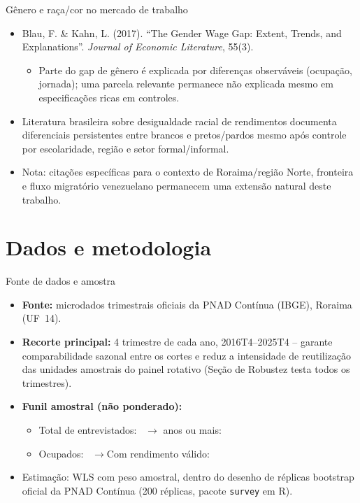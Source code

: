 \documentclass[aspectratio=169]{beamer}
\newcommand{\highlight}[1]{\textcolor{accentblue}{\textbf{#1}}}
\begin{document}
\begin{frame}{G\^enero e ra\c{c}a/cor no mercado de trabalho}
  \begin{itemize}
    \item Blau, F. \& Kahn, L. (2017). ``The Gender Wage Gap: Extent, Trends, and Explanations''. \textit{Journal of Economic Literature}, 55(3).
    \begin{itemize}
      \item Parte do gap de g\^enero \'e explicada por diferen\c{c}as observ\'aveis (ocupa\c{c}\~ao, jornada); uma parcela relevante permanece n\~ao explicada mesmo em especifica\c{c}\~oes ricas em controles.
    \end{itemize}
    \item Literatura brasileira sobre desigualdade racial de rendimentos documenta diferenciais persistentes entre brancos e pretos/pardos mesmo ap\'os controle por escolaridade, regi\~ao e setor formal/informal.
    \item \alert{Nota:} cita\c{c}\~oes espec\'ificas para o contexto de Roraima/regi\~ao Norte, fronteira e fluxo migrat\'orio venezuelano permanecem uma extens\~ao natural deste trabalho.
  \end{itemize}
\end{frame}

\section{Dados e metodologia}

\begin{frame}{Fonte de dados e amostra}
  \begin{itemize}
    \item \highlight{Fonte:} microdados trimestrais oficiais da PNAD Cont\'inua (IBGE), Roraima (UF~14).
    \item \highlight{Recorte principal:} 4\textordmasculine{} trimestre de cada ano, 2016T4--2025T4 -- garante comparabilidade sazonal entre os cortes e reduz a intensidade de reutiliza\c{c}\~ao das unidades amostrais do painel rotativo (Se\c{c}\~ao de Robustez testa todos os trimestres).
    \item \highlight{Funil amostral (n\~ao ponderado):}
    \begin{itemize}
      \item Total de entrevistados: \NTotal\ \quad$\to$ anos ou mais: \NQuatorzeMais
      \item Ocupados: \NOcupados\ \quad$\to$\quad Com rendimento v\'alido: \NRendaValida
    \end{itemize}
    \item Estima\c{c}\~ao: WLS com peso amostral, dentro do desenho de r\'eplicas bootstrap oficial da PNAD Cont\'inua (200 r\'eplicas, pacote \texttt{survey} em R).
  \end{itemize}
\end{frame}
\end{document}
